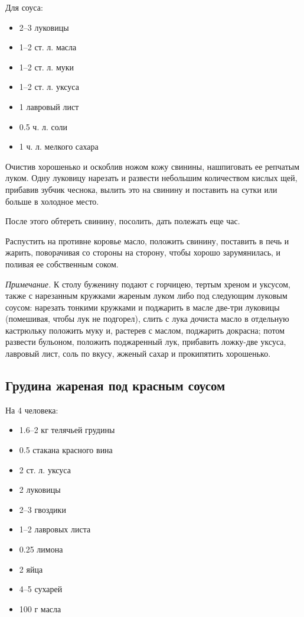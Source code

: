 Для соуса: 

\begin{itemize} 
	\item 2–3 луковицы 
    \item 1–2 ст. л. масла 
    \item 1–2 ст. л. муки 
    \item 1–2 ст. л. уксуса 
    \item 1 лавровый лист 
    \item 0.5 ч. л. соли 
    \item 1 ч. л. мелкого сахара
\end{itemize}

Очистив хорошенько и оскоблив ножом кожу свинины, нашпиговать ее репчатым луком. Одну луковицу нарезать и развести небольшим количеством кислых щей, прибавив зубчик чеснока, вылить это на свинину и поставить на сутки или больше в холодное место.

После этого обтереть свинину, посолить, дать полежать еще час.

Распустить на противне коровье масло, положить свинину, поставить в печь и жарить, поворачивая со стороны на сторону, чтобы хорошо зарумянилась, и поливая ее собственным соком.

\emph{Примечание.} К столу буженину подают с горчицею, тертым хреном и уксусом, также с нарезанным кружками жареным луком либо под следующим луковым соусом: нарезать тонкими кружками и поджарить в масле две-три луковицы (помешивая, чтобы лук не подгорел), слить с лука дочиста масло в отдельную кастрюльку положить муку и, растерев с маслом, поджарить докрасна; потом развести бульоном, положить поджаренный лук, прибавить ложку-две уксуса, лавровый лист, соль по вкусу, жженый сахар и прокипятить хорошенько.

\subsection{Грудина жареная под красным соусом}
На 4 человека:
\begin{itemize} 
	\item  1.6–2 кг телячьей грудины 
    \item 0.5 стакана красного вина 
    \item 2 ст. л. уксуса 
    \item 2 луковицы 
    \item 2–3 гвоздики 
    \item 1–2 лавровых листа 
    \item 0.25 лимона 
    \item 2 яйца 
    \item 4–5 сухарей 
    \item 100 г масла
\end{itemize}

